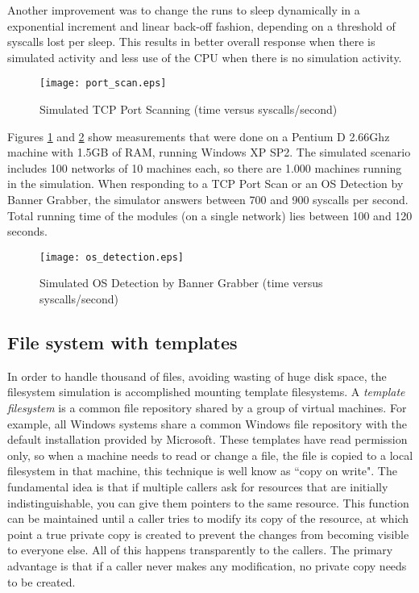 \documentclass{llncs}
\begin{document}
 Another improvement was to change the runs to sleep dynamically in a exponential increment and linear back-off fashion,
 depending on a threshold of syscalls lost per sleep. This results in better overall response when there is simulated 
activity and less use of the CPU when there is no simulation activity. 

\begin{figure}[t]
\centering
\texttt{[image: port\_scan.eps]}
\caption{Simulated TCP Port Scanning (time versus syscalls/second)}
\label{fig:syscalls1}
\end{figure}

Figures \ref{fig:syscalls1} and \ref{fig:syscalls2} show measurements that were done on a 
Pentium D 2.66Ghz machine with 1.5GB of RAM, running Windows XP SP2.
The simulated scenario includes 100 networks of 10 machines each, 
so there are 1.000 machines running in the simulation.
When responding to a TCP Port Scan or an OS Detection by Banner Grabber, 
the simulator answers between 700 and 900 syscalls per second.
Total running time of the modules (on a single network) lies between 100 and 120 seconds.

\begin{figure}[t]
\centering
\texttt{[image: os\_detection.eps]}
\caption{Simulated OS Detection by Banner Grabber (time versus syscalls/second)}
\label{fig:syscalls2}
\end{figure}


\subsection{File system with templates}

In order to handle thousand of files, avoiding wasting of huge disk space, 
the filesystem simulation is accomplished 
mounting template filesystems. 
A \emph{template filesystem} is a common file repository shared by a group of virtual machines. 
For example, all Windows systems share a common Windows file repository with the default installation provided by Microsoft. 
These templates have read permission only, so when a machine needs to read or change a file, 
the file is copied to a local filesystem in that machine, this technique is well know as ``copy on write".
 The fundamental idea is that if multiple callers ask for resources that are initially indistinguishable, 
you can give them pointers to the same resource. This function can be maintained until a caller tries to modify
 its copy of the resource, at which point a true private copy is created to prevent the changes 
from becoming visible 
to everyone else. All of this happens transparently to the callers. The primary advantage is that if a caller never 
makes any modification, no private copy needs to be created.
\end{document}

